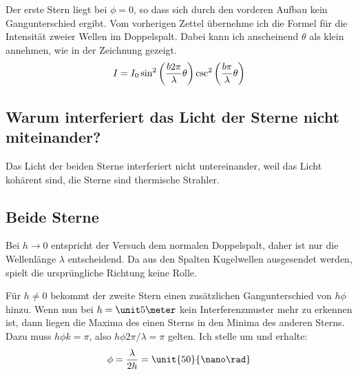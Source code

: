 Der erste Stern liegt bei $\phi = 0$, so dass sich durch den vorderen Aufbau
kein Gangunterschied ergibt. Vom vorherigen Zettel übernehme ich die Formel für
die Intensität zweier Wellen im Doppelspalt. Dabei kann ich anscheinend
$\theta$ als klein annehmen, wie in der Zeichnung gezeigt.
\[
	I =
	I_0 \sin^2\del{\frac{b 2 \pi}{\lambda} \theta} \csc^2\del{\frac{b \pi}{\lambda} \theta}
\]


\subsection{Warum interferiert das Licht der Sterne nicht miteinander?}

Das Licht der beiden Sterne interferiert nicht untereinander, weil das Licht
kohärent sind, die Sterne sind thermische Strahler.

\subsection{Beide Sterne}

Bei $h \to 0$ entspricht der Versuch dem normalen Doppelspalt, daher ist nur
die Wellenlänge $\lambda$ entscheidend. Da aus den Spalten Kugelwellen
ausgesendet werden, spielt die ursprüngliche Richtung keine Rolle.

Für $h \neq 0$ bekommt der zweite Stern einen zusätzlichen Gangunterschied von
$h \phi$ hinzu. Wenn nun bei $h = \unit 5 \meter$ kein Interferenzmuster mehr
zu erkennen ist, dann liegen die Maxima des einen Sterns in den Minima des
anderen Sterns. Dazu muss $h \phi k = \pi$, also $h \phi 2 \pi / \lambda = \pi$ gelten. Ich stelle um und erhalte:
\[
	\phi = \frac{\lambda}{2 h} = \unit{50}{\nano\rad}
\]

%
%



